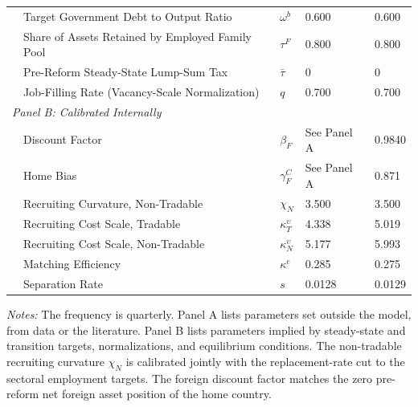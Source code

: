 \begin{table}[ht!]
{\begin{tabular}{lllll}
      & Target Government Debt to Output Ratio & $\omega^b$ & 0.600 & 0.600 \\
      & Share of Assets Retained by Employed Family Pool & $\tau^F$ & 0.800 & 0.800 \\
      & Pre-Reform Steady-State Lump-Sum Tax & $\bar\tau$ & 0 & 0 \\
      & Job-Filling Rate (Vacancy-Scale Normalization) & $q$ & 0.700 & 0.700 \\
      \midrule
      \multicolumn{5}{l}{\textit{Panel B: Calibrated Internally}} \\
      & Discount Factor & $\beta_F$ & See Panel A & 0.9840 \\
      & Home Bias & $\gamma_F^C$ & See Panel A & 0.871 \\
      & Recruiting Curvature, Non-Tradable & $\chi_N$ & 3.500 & 3.500 \\
      & Recruiting Cost Scale, Tradable & $\kappa^{\upsilon}_T$ & 4.338 & 5.019 \\
      & Recruiting Cost Scale, Non-Tradable & $\kappa^{\upsilon}_N$ & 5.177 & 5.993 \\
      & Matching Efficiency & $\kappa^e$ & 0.285 & 0.275 \\
      & Separation Rate & $s$ & 0.0128 & 0.0129 \\
      \bottomrule
    \end{tabular}%
  }
  \begin{flushleft}
  \footnotesize \textit{Notes:} The frequency is quarterly. Panel A lists parameters set outside the model, from data or the literature. Panel B lists parameters implied by steady-state and transition targets, normalizations, and equilibrium conditions. The non-tradable recruiting curvature $\chi_N$ is calibrated jointly with the replacement-rate cut to the sectoral employment targets. The foreign discount factor matches the zero pre-reform net foreign asset position of the home country.
  \end{flushleft}
\end{table}
